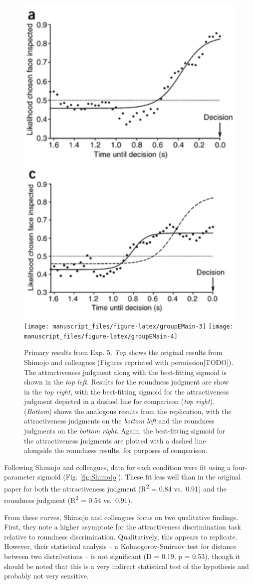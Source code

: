 \documentclass[
  man,floatsintext]{apa6}
\begin{document}
\begin{figure}
\includegraphics[width=0.45\linewidth]{figGroupEOrigA} \includegraphics[width=0.45\linewidth]{figGroupEOrigB} \texttt{[image: manuscript\_files/figure-latex/groupEMain-3]} \texttt{[image: manuscript\_files/figure-latex/groupEMain-4]} \caption{Primary results from Exp. 5. \emph{Top} shows the original results from Shimojo and colleagues (Figures reprinted with permission{[}TODO{]}). The attractiveness judgment along with the best-fitting sigmoid is shown in the \emph{top left}. Results for the roundness judgment are show in the \emph{top right}, with the best-fitting sigmoid for the attractiveness judgment depicted in a dashed line for comparison (\emph{top right}). (\emph{Bottom}) shows the analogous results from the replication, with the attractiveness judgments on the \emph{bottom left} and the roundness judgments on the \emph{bottom right}. Again, the best-fitting sigmoid for the attractiveness judgments are plotted with a dashed line alongside the roundness results, for purposes of comparison.}\label{fig:groupEMain}
\end{figure}

Following Shimojo and colleagues, data for each condition were fit using a four-parameter sigmoid (Fig. \ref{fig:Shimojo}). These fit less well than in the original paper for both the attractiveness judgment (R\textsuperscript{2} = 0.84 vs.~0.91) and the roundness judgment (R\textsuperscript{2} = 0.54 vs.~0.91).

From these curves, Shimojo and colleagues focus on two qualitative findings. First, they note a higher asymptote for the attractiveness discrimination task relative to roundness discrimination. Qualitatively, this appears to replicate. However, their statistical analysis -- a Kolmogorov-Smirnov test for distance between two distributions -- is not significant (D = 0.19, p = 0.53), though it should be noted that this is a very indirect statistical test of the hypothesis and probably not very sensitive.
\end{document}
